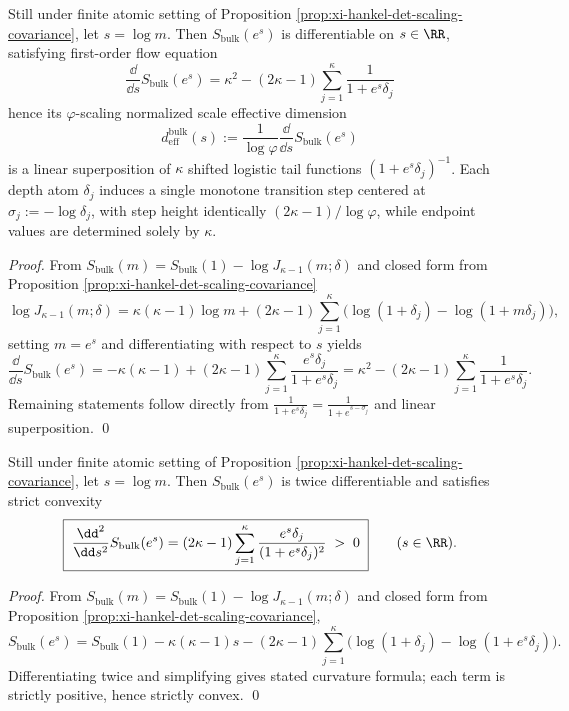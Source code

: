 \begin{corollary}\label{cor:xi-bulk-entropy-rg-staircase}
Still under finite atomic setting of Proposition \ref{prop:xi-hankel-det-scaling-covariance}, let \(s=\log m\).
Then \(S_{\mathrm{bulk}}(e^s)\) is differentiable on \(s\in\RR\), satisfying first-order flow equation
\[
\boxed{\;
\frac{\dd}{\dd s}S_{\mathrm{bulk}}(e^s)
=\kappa^{2}-(2\kappa-1)\sum_{j=1}^{\kappa}\frac{1}{1+e^{s}\delta_{j}}\;}
\]
hence its \(\varphi\)-scaling normalized scale effective dimension
\[
d_{\mathrm{eff}}^{\mathrm{bulk}}(s):=\frac{1}{\log\varphi}\frac{\dd}{\dd s}S_{\mathrm{bulk}}(e^s)
\]
is a linear superposition of \(\kappa\) shifted logistic tail functions \((1+e^{s}\delta_j)^{-1}\).
Each depth atom \(\delta_j\) induces a single monotone transition step centered at \(\sigma_j:=-\log\delta_j\), with step height identically \((2\kappa-1)/\log\varphi\), while endpoint values are determined solely by \(\kappa\).
\end{corollary}
\begin{proof}
From \(S_{\mathrm{bulk}}(m)=S_{\mathrm{bulk}}(1)-\log J_{\kappa-1}(m;\delta)\) and closed form from Proposition \ref{prop:xi-hankel-det-scaling-covariance}
\[
\log J_{\kappa-1}(m;\delta)
=\kappa(\kappa-1)\log m
+(2\kappa-1)\sum_{j=1}^{\kappa}\bigl(\log(1+\delta_j)-\log(1+m\delta_j)\bigr),
\]
setting \(m=e^s\) and differentiating with respect to \(s\) yields
\[
\frac{\dd}{\dd s}S_{\mathrm{bulk}}(e^s)
=-\kappa(\kappa-1)+(2\kappa-1)\sum_{j=1}^{\kappa}\frac{e^s\delta_j}{1+e^s\delta_j}
=\kappa^2-(2\kappa-1)\sum_{j=1}^{\kappa}\frac{1}{1+e^s\delta_j}.
\]
Remaining statements follow directly from \(\frac{1}{1+e^s\delta_j}=\frac{1}{1+e^{s-\sigma_j}}\) and linear superposition. \qed
\end{proof}

\begin{corollary}\label{cor:xi-bulk-entropy-strict-convexity}
Still under finite atomic setting of Proposition \ref{prop:xi-hankel-det-scaling-covariance}, let \(s=\log m\).
Then \(S_{\mathrm{bulk}}(e^s)\) is twice differentiable and satisfies strict convexity
\[
\boxed{\;
\frac{\dd^2}{\dd s^2}S_{\mathrm{bulk}}(e^s)
=(2\kappa-1)\sum_{j=1}^{\kappa}\frac{e^s\delta_j}{(1+e^s\delta_j)^2}\;>\;0\;}
\qquad(s\in\RR).
\]
\end{corollary}
\begin{proof}
From \(S_{\mathrm{bulk}}(m)=S_{\mathrm{bulk}}(1)-\log J_{\kappa-1}(m;\delta)\) and closed form from Proposition \ref{prop:xi-hankel-det-scaling-covariance},
\[
S_{\mathrm{bulk}}(e^s)
=S_{\mathrm{bulk}}(1)-\kappa(\kappa-1)s-(2\kappa-1)\sum_{j=1}^{\kappa}\bigl(\log(1+\delta_j)-\log(1+e^s\delta_j)\bigr).
\]
Differentiating twice and simplifying gives stated curvature formula; each term is strictly positive, hence strictly convex. \qed
\end{proof}

